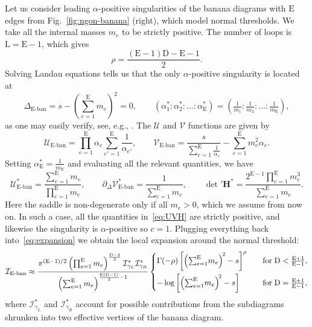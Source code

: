 \documentclass[12pt]{article}
\numberwithin{figure}{section}
\def \be {\begin{equation}}
\def \ee {\end{equation}}
\def \D {\mathrm{D}}
\def \E {\mathrm{E}}
\def \L {\mathrm{L}}
\def \U {\mathcal{U}}
\def \V {\mathcal{V}}
\def \I {\mathcal{I}}
\def \RR {\mathcal{I}^\ast}
\def \upgamma {\rho}
\begin{document}
				
				Let us consider leading $\alpha$-positive singularities of the banana diagrams with $\E$ edges from Fig.~\ref{fig:ngon-banana} (right), which model normal thresholds. We take all the internal masses $m_e$ to be strictly positive. The number of loops is $\L = \E-1$, which gives
				\be
				\upgamma = \frac{(\E-1)\D - \E -1}{2}.
				\ee
				Solving Landau equations tells us that the only $\alpha$-positive singularity is located at
				\be
				\Delta_{\E\text{-ban}} = s - ({\textstyle\sum}_{e=1}^{\E} m_e)^2 = 0, \qquad (\alpha_1^\ast : \alpha_2^\ast : \dots : \alpha_\E^\ast) = (\tfrac{1}{m_1} : \tfrac{1}{m_2} : \dots : \tfrac{1}{m_\E}),
				\ee
				as one may easily verify, see, e.g., \cite[Sec.~2.6]{Mizera:2021icv}. The $\U$ and $\V$ functions are given by
				\be
				\U_{\E\text{-ban}}  = \prod_{e=1}^{\E}\alpha_e \sum_{e'=1}^{\E}\frac{1}{\alpha_{e'}},\qquad
				\V_{\E\text{-ban}}  = \frac{s}{ {\textstyle\sum}_{e=1}^{\E}\tfrac{1}{\alpha_e}} - \sum_{e=1}^{\E} m_e^2 \alpha_e.
				\ee
			    Setting $\alpha_{\E}^\ast = \tfrac{1}{m_\E}$ and evaluating all the relevant quantities, we have
				\be\label{eq:UVH}
				\U_{\E\text{-ban}}^\ast = \frac{\sum_{e=1}^{\E} m_e}{\prod_{e=1}^{\E}m_e} ,\qquad
				\partial_{\Delta} \V^\ast_{\E\text{-ban}}  = \frac{1}{\sum_{e=1}^{\E} m_e},\qquad
				{\det}' \mathbf{H}^\ast = \frac{2^{\E-1} \prod_{e=1}^{\E}m_e^3 }{\sum_{e=1}^{\E} m_e}.
				\ee
				Here the saddle is non-degenerate only if all $m_e>0$, which we assume from now on. In such a case, all the quantities in~\eqref{eq:UVH} are strictly positive, and likewise the singularity is $\alpha$-positive so $c=1$. Plugging everything back into~\eqref{eq:expansion} we obtain the local expansion around the normal threshold:
				\be\label{eq:banana}
				\I_{\E\text{-ban}} \approx \frac{\pi^{(\E-1)/2} \left( \prod_{e=1}^{\E}m_e \right)^{\frac{\D-3}{2}} \RR_{\gamma_L} \RR_{\gamma_R} }{\left( \sum_{e=1}^{\E}m_e \right)^{\frac{\E(\D-1)}{2}-1}} \begin{dcases}
				\Gamma(-\upgamma) \left[ \left( {\textstyle\sum}_{e=1}^{\E} m_e \right)^{\!2} - s \right]^{\upgamma} \quad&\mathrm{for}\; \D < \tfrac{\E+1}{\E-1},\\
				-\log\left[ \left( {\textstyle\sum}_{e=1}^{\E} m_e \right)^{\!2} - s \right] \quad&\mathrm{for}\; \D = \tfrac{\E+1}{\E-1},
				\end{dcases}
				\ee
				where $\RR_{\gamma_L}$ and $\RR_{\gamma_R}$ account for possible contributions from the subdiagrams shrunken into two effective vertices of the banana diagram.
				
\end{document}
